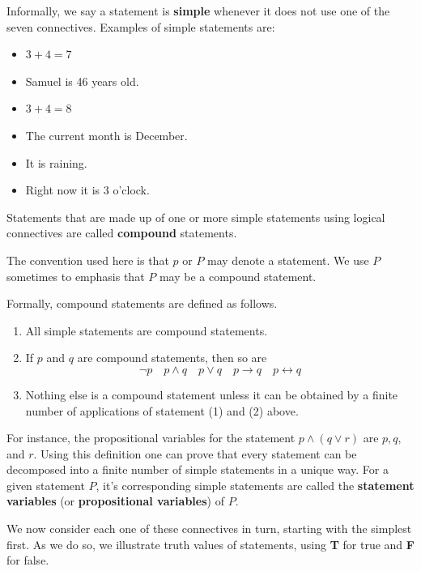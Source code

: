 \documentclass[
  letterpaper,
  10pt,
  reqno,
  twopage,
  openany]{book}
\providecommand{\tightlist}{%
  \setlength{\itemsep}{0pt}\setlength{\parskip}{0pt}}\usepackage{longtable,booktabs,array}
\theoremstyle{plain}
\theoremstyle{definition}
\theoremstyle{definition}
\theoremstyle{definition}
\theoremstyle{plain}
\theoremstyle{plain}
\theoremstyle{remark}
\begin{document}
Informally, we say a statement is  \textbf{simple}
whenever it does not use one of the seven connectives. Examples of
simple statements are:

\begin{itemize}
\tightlist
\item
  \(3+4=7\)
\item
  Samuel is 46 years old.
\item
  \(3+4=8\)
\item
  The current month is December.
\item
  It is raining.
\item
  Right now it is 3 o'clock.
\end{itemize}

Statements that are made up of one or more simple statements using
logical connectives are called  \textbf{compound}
statements.

The convention used here is that \(p\) or \(P\) may denote a statement.
We use \(P\) sometimes to emphasis that \(P\) may be a compound
statement.

Formally, compound statements are defined as follows.

\begin{enumerate}
\def\labelenumi{\arabic{enumi}.}
\tightlist
\item
  All simple statements are compound statements.
\item
  If \(p\) and \(q\) are compound statements, then so are \[
  \neg p \quad
  p \land q \quad
  p \lor q \quad
  p \rightarrow q \quad
  p \leftrightarrow q
  \]
\item
  Nothing else is a compound statement unless it can be obtained by a
  finite number of applications of statement (1) and (2) above.
\end{enumerate}

For instance, the propositional variables for the statement
\(p\land (q \lor r)\) are \(p, q,\) and \(r\). Using this definition one
can prove that every statement can be decomposed into a finite number of
simple statements in a unique way. For a given statement \(P\), it's
corresponding simple statements are called the
 \textbf{statement variables} (or
 \textbf{propositional variables}) of
\(P\).

We now consider each one of these connectives in turn, starting with the
simplest first. As we do so, we illustrate truth values of statements,
using \textbf{T} for true and \textbf{F} for false.
\end{document}
